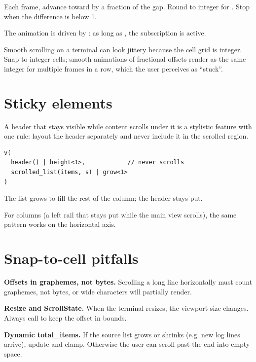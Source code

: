 Each frame, advance  toward  by a
fraction of the gap. Round to integer for . Stop
when the difference is below 1.

The animation is driven by : as long
as , the subscription is active.

\begin{warning}
Smooth scrolling on a terminal can look jittery because the
cell grid is integer. Snap to integer cells; smooth animations
of fractional offsets render as the same integer for multiple
frames in a row, which the user perceives as ``stuck''.
\end{warning}

\section{Sticky elements}

A header that stays visible while content scrolls under it is a
stylistic feature with one rule: layout the header separately
and never include it in the scrolled region.

\begin{lstlisting}
v(
  header() | height<1>,            // never scrolls
  scrolled_list(items, s) | grow<1>
)
\end{lstlisting}

The list grows to fill the rest of the column; the header stays
put.

For columns (a left rail that stays put while the main view
scrolls), the same pattern works on the horizontal axis.

\section{Snap-to-cell pitfalls}

\begin{warning}
\textbf{Offsets in graphemes, not bytes.} Scrolling a long line
horizontally must count graphemes, not bytes, or wide
characters will partially render.
\end{warning}

\begin{warning}
\textbf{Resize and ScrollState.} When the terminal resizes, the
viewport size changes. Always call  to keep the
offset in bounds.
\end{warning}

\begin{warning}
\textbf{Dynamic total\_items.} If the source list grows or
shrinks (e.g. new log lines arrive), update
 and clamp. Otherwise the user can scroll
past the end into empty space.
\end{warning}

